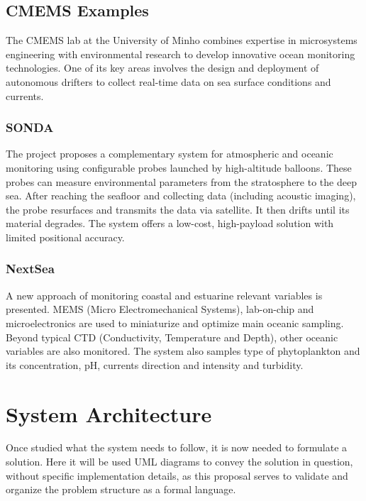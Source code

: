 \subsection{CMEMS Examples}
The CMEMS lab at the University of Minho combines expertise 
in microsystems engineering with environmental research to 
develop innovative ocean monitoring technologies. One of 
its key areas involves the design and deployment of autonomous 
drifters to collect real-time data on sea surface conditions 
and currents.

\subsubsection{SONDA}
The project proposes a complementary system for atmospheric
and oceanic monitoring using configurable probes launched by
high-altitude balloons. These probes can measure environmental
parameters from the stratosphere to the deep sea. After 
reaching the seafloor and collecting data (including acoustic 
imaging), the probe resurfaces and transmits the data via 
satellite. It then drifts until its material degrades. The 
system offers a low-cost, high-payload solution with 
limited positional accuracy.


\subsubsection{NextSea}
A new approach of monitoring coastal and estuarine relevant variables is presented. MEMS
(Micro Electromechanical Systems), lab-on-chip and microelectronics are used to 
miniaturize and optimize main oceanic sampling. Beyond typical CTD (Conductivity, Temperature
and Depth), other oceanic variables are also monitored. The system also samples type of
phytoplankton and its concentration, pH, currents direction and intensity and turbidity.

\section{System Architecture}

Once studied what the system needs to follow, it is now needed to formulate a solution.
Here it will be used UML diagrams to convey the solution in question, without specific 
implementation details, as this proposal serves to validate and organize the problem 
structure as a formal language.

